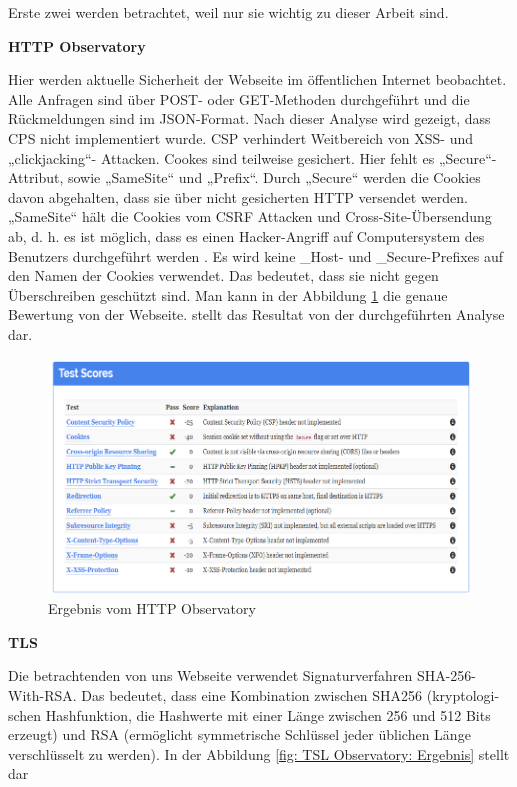 Erste zwei werden betrachtet, weil nur sie wichtig zu dieser Arbeit sind.

\pagebreak

\textbf{HTTP Observatory}

Hier werden aktuelle Sicherheit der Webseite im öffentlichen Internet beobachtet. Alle Anfragen sind über POST- oder GET-Methoden durchgeführt und die Rückmeldungen sind im JSON-Format.
Nach dieser Analyse wird gezeigt, dass \ac{CPS} nicht implementiert wurde. CSP verhindert Weitbereich von \ac{XSS}- und „clickjacking“- Attacken. 
Cookes sind teilweise gesichert. Hier fehlt es „Secure“-Attribut, sowie „SameSite“ und „Prefix“.  Durch „Secure“ werden die Cookies davon abgehalten, dass sie über nicht gesicherten HTTP versendet werden. „SameSite“ hält die Cookies vom \ac{CSRF} Attacken und Cross-Site-Übersendung ab, d. h. es ist möglich, dass es einen Hacker-Angriff auf Computersystem des Benutzers durchgeführt werden \cite[postnote]{bentley:1999}
. Es wird keine \_Host- und \_Secure-Prefixes auf den Namen der Cookies verwendet. Das bedeutet, dass sie nicht gegen Überschreiben geschützt sind. Man kann in der Abbildung \ref{fig: HTTP Observatory: Ergebnis} die genaue Bewertung von der Webseite.
 stellt das Resultat von der durchgeführten Analyse dar.
 
\begin{figure}[h]
	\centering
	\includegraphics[width=0.8\linewidth]{Graphics/eergebnisobser.png}
	\caption[Egebniss vom HTTP Observatory]{ Ergebnis vom HTTP Observatory }
	\label{fig: HTTP Observatory: Ergebnis}
\end{figure}

\textbf{TLS}

Die betrachtenden von uns Webseite verwendet Signaturverfahren SHA-256-With-RSA. Das bedeutet, dass eine Kombination zwischen SHA256 (kryptologi-schen Hashfunktion, die Hashwerte mit einer Länge zwischen 256 und 512 Bits erzeugt) und \ac{RSA} (ermöglicht symmetrische Schlüssel jeder üblichen Länge verschlüsselt zu werden). In der Abbildung \ref{fig: TSL Observatory: Ergebnis} stellt dar

